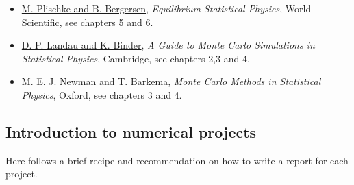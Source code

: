 \documentclass[%
oneside,                 %
final,                   %
10pt]{article}
\begin{document}
\begin{itemize}
  \item \href{{http://www.worldscientific.com/worldscibooks/10.1142/5660}}{M. Plischke and B. Bergersen}, \emph{Equilibrium Statistical Physics}, World Scientific, see chapters 5 and 6.

  \item \href{{http://www.cambridge.org/no/academic/subjects/physics/computational-science-and-modelling/guide-monte-carlo-simulations-statistical-physics-4th-edition?format=HB}}{D. P. Landau and K. Binder}, \emph{A Guide to Monte Carlo Simulations in Statistical Physics}, Cambridge, see chapters 2,3 and 4.

  \item \href{{https://global.oup.com/academic/product/monte-carlo-methods-in-statistical-physics-9780198517979?cc=no&lang=en&}}{M. E. J. Newman and T. Barkema}, \emph{Monte Carlo Methods in Statistical Physics}, Oxford, see chapters 3 and 4.
\end{itemize}

\noindent
\subsection{Introduction to numerical projects}

Here follows a brief recipe and recommendation on how to write a report for each
project.
\end{document}
